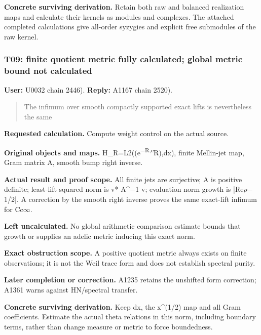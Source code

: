 \textbf{Concrete surviving derivation.} Retain both raw and balanced
realization maps and calculate their kernels as modules and complexes.
The attached completed calculations give all-order syzygies and explicit
free submodules of the raw kernel.

\subsubsection{T09: finite quotient metric fully calculated; global
metric bound not
calculated}\label{TranscriptLedgerStage:t09-finite-quotient-metric-fully-calculated-global-metric-bound-not-calculated}

\textbf{User:} U0032
\protect{} chain 2446).
\textbf{Reply:} A1167
\protect{} chain 2520).

\begin{quote}
The infimum over smooth compactly supported exact lifts is nevertheless
the same
\end{quote}

\textbf{Requested calculation.} Compute weight control on the actual
source.

\textbf{Original objects and maps.}
H\_R=L2((e\textsuperscript{\allowbreak{}\ensuremath{−}\allowbreak{}R,e}R),dx),
finite Mellin-jet map, Gram matrix A, smooth bump right inverse.

\textbf{Actual result and proof scope.} All finite jets are surjective;
A is positive definite; least-lift squared norm is v*
A\textasciicircum{}\allowbreak{}\ensuremath{−}\allowbreak{}1 v;
evaluation norm growth is
|Re\allowbreak{}\ensuremath{ρ}\allowbreak{}\allowbreak{}\ensuremath{−}\allowbreak{}1/2|.
A correction by the smooth right inverse proves the same exact-lift
infimum for Cc\allowbreak{}\ensuremath{∞}\allowbreak{}.

\textbf{Left uncalculated.} No global arithmetic comparison estimate
bounds that growth or supplies an adelic metric inducing this exact
norm.

\textbf{Exact obstruction scope.} A positive quotient metric always
exists on finite observations; it is not the Weil trace form and does
not establish spectral purity.

\textbf{Later completion or correction.} A1235 retains the unshifted
form correction; A1361 warns against HN/spectral transfer.

\textbf{Concrete surviving derivation.} Keep dx, the x\^{}(1/2) map and
all Gram coefficients. Estimate the actual theta relations in this norm,
including boundary terms, rather than change measure or metric to force
boundedness.

